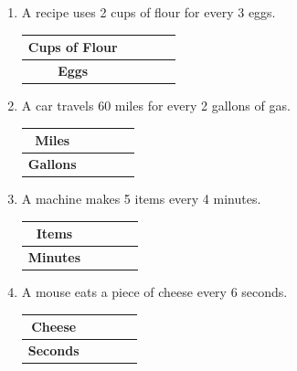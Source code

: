 \documentclass[12pt, letterpaper, fleqn]{article}
\begin{document}
\begin{enumerate}[itemsep=2cm, leftmargin=0.6cm]

\item A recipe uses 2 cups of flour for every 3 eggs.

\begin{center}
\begin{tabular}{|c|c|c|c|c|}
\hline
\textbf{Cups of Flour} & & & & \\
\hline
\textbf{Eggs} & & & & \\
\hline
\end{tabular}
\end{center}

\vspace{0.3cm}

\item A car travels 60 miles for every 2 gallons of gas.

\begin{center}
\begin{tabular}{|c|c|c|c|c|}
\hline
\textbf{Miles} & & & & \\
\hline
\textbf{Gallons} & & & & \\
\hline
\end{tabular}
\end{center}

\vspace{0.3cm}

\item A machine makes 5 items every 4 minutes.

\begin{center}
\begin{tabular}{|c|c|c|c|c|}
\hline
\textbf{Items} & & & & \\
\hline
\textbf{Minutes} & & & & \\
\hline
\end{tabular}
\end{center}

\vspace{0.3cm}

\item A mouse eats a piece of cheese every 6 seconds. 
\begin{center}
\begin{tabular}{|c|c|c|c|c|}
\hline
\textbf{Cheese} & & & & \\
\hline
\textbf{Seconds} & & & & \\
\hline
\end{tabular}
\end{center}

\end{enumerate}
\end{document}
